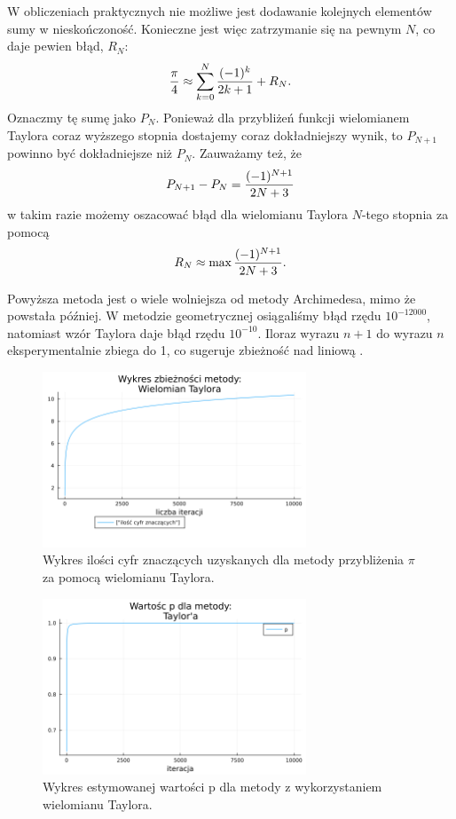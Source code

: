W obliczeniach praktycznych nie możliwe jest dodawanie kolejnych elementów sumy w nieskończoność. Konieczne jest więc zatrzymanie się na pewnym $N$, co daje pewien błąd, $R_N$:
$$\frac\pi4\approx \sum\limits_{k=0}^N{(-1)^k\over 2k+1}+R_N.$$
Oznaczmy tę sumę jako $P_N$. Ponieważ dla przybliżeń funkcji wielomianem Taylora coraz wyższego stopnia dostajemy coraz dokładniejszy wynik, to $P_{N+1}$ powinno być dokładniejsze niż $P_N$. Zauważamy też, że
$$P_{N+1}-P_N={(-1)^{N+1}\over 2N+3}$$
w takim razie możemy oszacować błąd dla wielomianu Taylora $N$-tego stopnia za pomocą
$$R_N\approx \max{(-1)^{N+1}\over 2N+3}.$$

Powyższa metoda jest o wiele wolniejsza od metody Archimedesa, mimo że powstała później. W metodzie geometrycznej osiągaliśmy błąd rzędu $10^{-12000}$, natomiast wzór Taylora daje błąd rzędu $10^{-10}$. Iloraz wyrazu $n+1$ do wyrazu $n$ eksperymentalnie zbiega do 1, co sugeruje zbieżność nad liniową \cite{bog}.

\begin{figure}[!h]\centering
    \renewcommand{\figurename}{Wykres}
    \includegraphics[width=0.7\textwidth]{../prog/taylor_log_error.png}
    \caption{Wykres ilości cyfr znaczących uzyskanych dla metody przybliżenia  $\pi$ za pomocą wielomianu Taylora.}
    \label{taylor-series-error}
\end{figure}

\begin{figure}[!h]\centering
    \renewcommand{\figurename}{Wykres}
    \includegraphics[width=0.7\textwidth]{../prog/taylor_error_ratio.png}
    \caption{Wykres estymowanej wartości p dla metody z wykorzystaniem wielomianu Taylora.}
    \label{taylor-series-convergence}
\end{figure}


